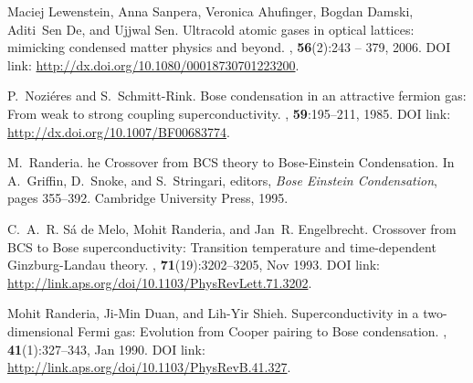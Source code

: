 \documentclass[a4paper,10pt]{article}
\begin{document}
\begin{thebibliography}{10}

Maciej Lewenstein, Anna Sanpera, Veronica Ahufinger, Bogdan Damski, Aditi~Sen
  De, and Ujjwal Sen.
\newblock Ultracold atomic gases in optical lattices: mimicking condensed
  matter physics and beyond.
, \textbf{56}(2):243 -- 379, 2006.
\newblock DOI link: \url{http://dx.doi.org/10.1080/00018730701223200}.



P.~Nozi{\'e}res and S.~Schmitt-Rink.
\newblock Bose condensation in an attractive fermion gas: From weak to strong
  coupling superconductivity.
, \textbf{59}:195--211, 1985.
\newblock DOI link: \url{http://dx.doi.org/10.1007/BF00683774}.

M.~Randeria.
he {C}rossover from {BCS} theory to {B}ose-{E}instein
  {C}ondensation.
\newblock In A.~Griffin, D.~Snoke, and S.~Stringari, editors, {\em {B}ose
  {E}instein {C}ondensation}, pages 355--392. Cambridge University Press, 1995.

C.~A.~R. {S{\'a} de Melo}, Mohit Randeria, and Jan~R. Engelbrecht.
\newblock Crossover from {BCS} to {B}ose superconductivity: {T}ransition
  temperature and time-dependent {G}inzburg-{L}andau theory.
, \textbf{71}(19):3202--3205, Nov 1993.
\newblock DOI link: \url{http://link.aps.org/doi/10.1103/PhysRevLett.71.3202}.

Mohit Randeria, Ji-Min Duan, and Lih-Yir Shieh.
\newblock Superconductivity in a two-dimensional {F}ermi gas: {E}volution from
  {C}ooper pairing to {B}ose condensation.
, \textbf{41}(1):327--343, Jan 1990.
\newblock DOI link: \url{http://link.aps.org/doi/10.1103/PhysRevB.41.327}.


\end{thebibliography}
\end{document}
